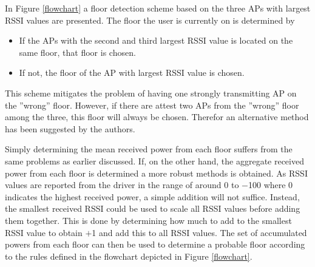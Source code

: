 \documentclass{LTHthesis}
\begin{document}
In Figure \ref{flowchart} a floor detection scheme based on the  three APs with largest RSSI values are presented. The floor the user is currently on is determined by 
%
\begin{itemize}
\item If the APs with the second and third largest RSSI value is located on the same floor, that floor is chosen.
\item If not, the floor of the AP with largest RSSI value is chosen.   
\end{itemize}      
%
This scheme mitigates the problem of having one strongly transmitting AP on the ''wrong'' floor. However, if there are attest two APs from the ''wrong'' floor among the three, this floor will always be chosen. Therefor an alternative method has been suggested by the authors. 

Simply determining the mean received power from each floor suffers from the same problems as earlier discussed. If, on the other hand, the aggregate received power from each floor is determined a more robust methods is obtained. As RSSI values are reported from the driver in the range of around 0 to $-$100 where 0 indicates the highest received power, a simple addition will not suffice. Instead, the smallest received RSSI could be used to scale all RSSI values before adding them together. This is done by determining how much to add to the smallest RSSI value to obtain $+$1 and add this to all RSSI values. The set of accumulated powers from each floor can then be used to determine a probable floor according to the rules defined in the flowchart depicted in Figure \ref{flowchart}.
\end{document}
